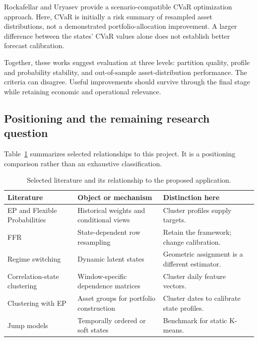 \documentclass[11pt,a4paper]{article}
\begin{document}
Rockafellar and Uryasev \cite{rockafellaruryasev2000} provide a scenario-compatible CVaR optimization approach. Here, CVaR is initially a risk summary of resampled asset distributions, not a demonstrated portfolio-allocation improvement. A larger difference between the states' CVaR values alone does not establish better forecast calibration.

Together, these works suggest evaluation at three levels: partition quality, profile and probability stability, and out-of-sample asset-distribution performance. The criteria can disagree. Useful improvements should survive through the final stage while retaining economic and operational relevance.

\subsection{Positioning and the remaining research question}

Table~\ref{tab:literature-position} summarizes selected relationships to this project. It is a positioning comparison rather than an exhaustive classification.

\begin{table}[htbp]
\centering
\small
\begin{tabularx}{\textwidth}{@{}p{}XX@{}}
\toprule
Literature & Object or mechanism & Distinction here\\
\midrule
EP and Flexible Probabilities \cite{meucci2008,meucci2013}
& Historical weights and conditional views
& Cluster profiles supply targets.\\[3pt]
FFR \cite{vorobets2025,kristensenvorobets2025}
& State-dependent row resampling
& Retain the framework; change calibration.\\[3pt]
Regime switching \cite{hamilton1989,angtimmermann2012}
& Dynamic latent states
& Geometric assignment is a different estimator.\\[3pt]
Correlation-state clustering \cite{munnix2012}
& Window-specific dependence matrices
& Cluster daily feature vectors.\\[3pt]
Clustering with EP \cite{mbaangaman2023}
& Asset groups for portfolio construction
& Cluster dates to calibrate state profiles.\\[3pt]
Jump models \cite{nystrup2021,aydinhan2024}
& Temporally ordered or soft states
& Benchmark for static K-means.\\
\bottomrule
\end{tabularx}
\caption{Selected literature and its relationship to the proposed application.}
\label{tab:literature-position}
\end{table}
\end{document}
